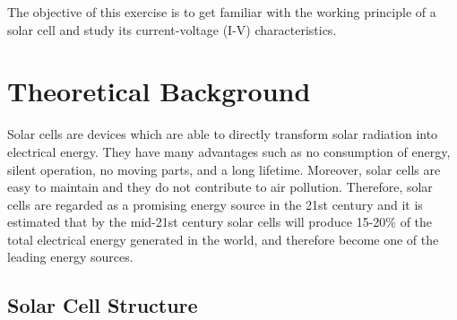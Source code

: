 \documentclass{article}
\begin{document}
The objective of this exercise is to get familiar with the working principle of a solar
cell and study its current-voltage (I-V) characteristics.

\section{Theoretical Background}

Solar cells are devices which are able to directly transform solar radiation into electrical
energy. They have many advantages such as no consumption of energy, silent operation,
no moving parts, and a long lifetime. Moreover, solar cells are easy to maintain and
they do not contribute to air pollution. Therefore, solar cells are regarded as a promising
energy source in the 21st century and it is estimated that by the mid-21st century solar cells
will produce 15-20\% of the total electrical energy generated in the world, and therefore
become one of the leading energy sources.

\subsection{Solar Cell Structure}
\end{document}

